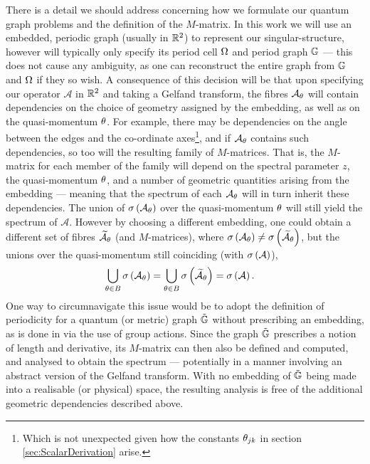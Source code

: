 There is a detail we should address concerning how we formulate our quantum graph problems and the definition of the $M$-matrix.
In this work we will use an embedded, periodic graph (usually in $\mathbb{R}^2$) to represent our singular-structure, however will typically only specify its period cell $\Omega$ and period graph $\mathbb{G}$ --- this does not cause any ambiguity, as one can reconstruct the entire graph from $\mathbb{G}$ and $\Omega$ if they so wish.
A consequence of this decision will be that upon specifying our operator $\mathcal{A}$ in $\mathbb{R}^2$ and taking a Gelfand transform, the fibres $\mathcal{A}_{\theta}$ will contain dependencies on the choice of geometry assigned by the embedding, as well as on the quasi-momentum $\theta$.
For example, there may be dependencies on the angle between the edges and the co-ordinate axes\footnote{Which is not unexpected given how the constants $\theta_{jk}$ in section \ref{sec:ScalarDerivation} arise.}, and if $\mathcal{A}_{\theta}$ contains such dependencies, so too will the resulting family of $M$-matrices.
That is, the $M$-matrix for each member of the family will depend on the spectral parameter $z$, the quasi-momentum $\theta$, and a number of geometric quantities arising from the embedding --- meaning that the spectrum of each $\mathcal{A}_{\theta}$ will in turn inherit these dependencies.
The union of $\sigma\left( \mathcal{A}_{\theta} \right)$ over the quasi-momentum $\theta$ will still yield the spectrum of $\mathcal{A}$.
However by choosing a different embedding, one could obtain a different set of fibres $\widetilde{\mathcal{A}}_{\theta}$ (and $M$-matrices), where $\sigma\left( \mathcal{A}_{\theta} \right) \neq \sigma\left( \widetilde{\mathcal{A}}_{\theta} \right)$, but the unions over the quasi-momentum still coinciding (with $\sigma\left( \mathcal{A} \right)$),
\begin{align*}
	\bigcup_{\theta\in B} \sigma\left( \mathcal{A}_{\theta} \right) &= \bigcup_{\theta\in B} \sigma\left( \widetilde{\mathcal{A}}_{\theta} \right) = \sigma\left( \mathcal{A} \right).
\end{align*}
One way to circumnavigate this issue would be to adopt the definition of periodicity for a quantum (or metric) graph $\tilde{\mathbb{G}}$ without prescribing an embedding, as is done in \cite[chapter 4]{berkolaiko2013introduction} via the use of group actions.
Since the graph $\tilde{\mathbb{G}}$ prescribes a notion of length and derivative, its $M$-matrix can then also be defined and computed, and analysed to obtain the spectrum --- potentially in a manner involving an abstract version of the Gelfand transform.
With no embedding of $\tilde{\mathbb{G}}$ being made into a realisable (or physical) space, the resulting analysis is free of the additional geometric dependencies described above.
